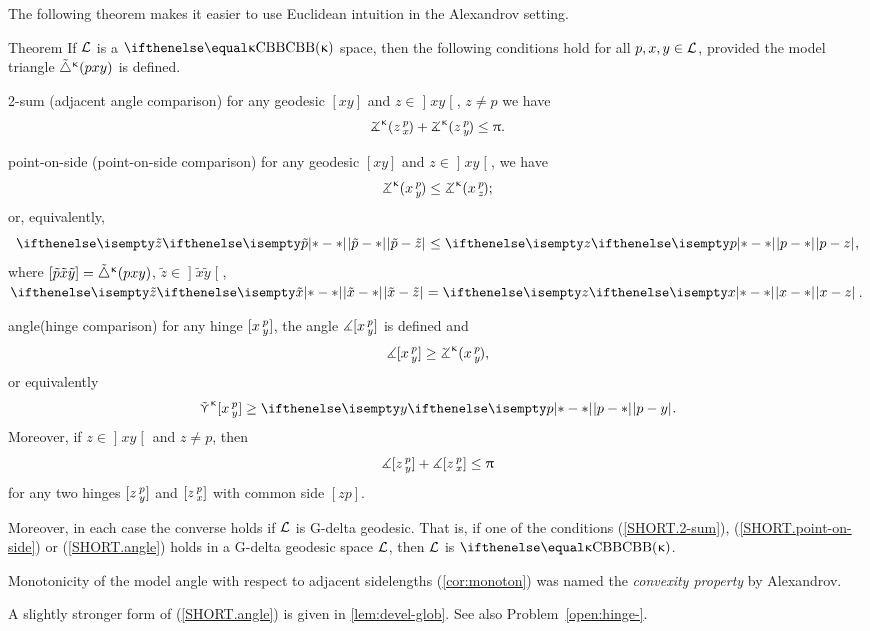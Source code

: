The following theorem makes it easier to use Euclidean intuition in the Alexandrov 
setting.
\begin{thm}{Theorem}
\label{thm:defs_of_alex} 
If $\mathcal{L}$ is a $\Alex\kappa$ space, 
then the following conditions hold for all $p,x,y\in \spc{L}$, provided the model triangle ${\tilde\triangle}^{\upkappa}(p x y)$ is defined.

\begin{subthm}{2-sum} 
(adjacent angle comparison) for any geodesic $[x y]$ and $z\in \mathopen{]}x y\mathclose{[}$, $z\not=p$ we have
\[\angk\kappa z p x
+\angk\kappa z p y\le \pi.\]
\end{subthm}

\begin{subthm}{point-on-side}
(point-on-side comparison)
for any geodesic $[x y]$ and $z\in \mathopen{]}x y\mathclose{[}$, we have
\[\angk\kappa x p y\le\angk\kappa x p z;\]
or, equivalently, 
\[\dist{\tilde p}{\tilde z}{}\le \dist{p}{z}{},\]
where $[{\tilde p}{\tilde x}{\tilde y}]={\tilde\triangle}^{\upkappa}(p x y)$, $\tilde z\in\mathopen{]} \tilde x\tilde y\mathclose{[}$, $\dist{\tilde x}{\tilde z}{}=\dist{x}{z}{}$.
\end{subthm}

\begin{subthm}{angle}(hinge comparison)
for any hinge $[x\,{}^{p}_{y}]$, the angle 
$\measuredangle[x\,{}^{p}_{y}]$ is defined and 
\[\mangle\hinge x p y\ge\angk\kappa x p y,\]
or equivalently
\[\side\kappa \hinge x p y\ge\dist{p}{y}{}.\]
Moreover, if $z\in\mathopen{]}x y\mathclose{[}$ and $z\not=p$, then 
\[\mangle\hinge z p y + \mangle\hinge z p x\le\pi\]
for any two hinges $[z\,{}^{p}_{y}]$ and $[z\,{}^{p}_{x}]$ with common side $[z p]$.
\end{subthm}

Moreover, in each case the converse holds if $\mathcal{L}$ is G-delta geodesic.
That is, if one of the conditions (\ref{SHORT.2-sum}), (\ref{SHORT.point-on-side}) or  (\ref{SHORT.angle}) holds in a  G-delta geodesic space $\mathcal{L}$, then $\mathcal{L}$ is $\Alex\kappa$.
\end{thm}

Monotonicity of the model angle with respect to adjacent sidelengths (\ref{cor:monoton}) was named the \emph{convexity property} by Alexandrov.

A slightly stronger form of (\ref{SHORT.angle}) is given in \ref{lem:devel-glob}.
See also Problem~\ref{open:hinge-}.


